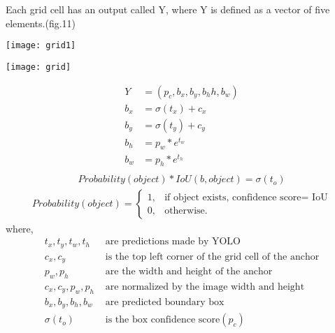 \documentclass[12pt]{report}
\begin{document}
	Each grid cell has an output called Y, where Y is defined as a vector of five elements.(fig.11)\\
\begin{center}
\begin{minipage}{0.49\linewidth}
\texttt{[image: grid1]}
\end{minipage}%
\hfill
\begin{minipage}{0.49\linewidth}
\texttt{[image: grid]}
\end{minipage}
\end{center}
\begin{equation}\label{1}
\begin{split}
Y&=(p_{c},b_{x},b_{y},b_h{h},b_{w})\\
b_{x}&=\sigma(t_{x})+c_{x}\\
b_{y}&=\sigma(t_{y})+c_{y}\\
b_{h}&=p_{w}*e^{t_{w}}\\
b_{w}&=p_{h}*e^{t_{h}}\\
\end{split}
\end{equation}
\begin{equation}\label{1}
\begin{split}
Probability(object)*IoU(b,object)=\sigma(t_o)
\end{split}
\end{equation}
\begin{equation}\label{1}
\begin{split}
Probability(object)=
\begin{cases}
1, &\text{if object exists, confidence score= IoU}\\
0, &\text{otherwise.}
\end{cases}
\end{split}
\end{equation}
where,
\begin{equation}\label{3}
\begin{split}
t_x ,t_y, t_w,t_h &\text{ are predictions made by YOLO}\\
c_x,c_y &\text{ is the top left corner of the grid cell of the anchor}\\
p_w,p_h &\text{ are the width and height of the anchor}\\
c_x,c_y,p_w,p_h &\text{ are normalized by the image width and height}\\
b_x,b_y,b_h,b_w &\text{ are predicted boundary box}\\
\sigma(t_o) &\text{ is the box confidence score} (p_c )\\
\end{split}
\end{equation}
\end{document}
